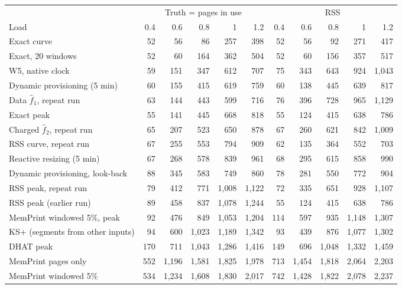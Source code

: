 \begin{tabular}{lrrrrrrrrrr}
\toprule
 & \multicolumn{5}{c}{Truth = pages in use} & \multicolumn{5}{c}{RSS} \\
\cmidrule(lr){2-6} \cmidrule(lr){7-11}
Load & 0.4 & 0.6 & 0.8 & 1 & 1.2 & 0.4 & 0.6 & 0.8 & 1 & 1.2 \\
\midrule
Exact curve & 52 & 56 & 86 & 257 & 398 & 52 & 56 & 92 & 271 & 417 \\
Exact, 20 windows & 52 & 60 & 164 & 362 & 504 & 52 & 60 & 156 & 357 & 517 \\
\memprint{} W5, native clock & 59 & 151 & 347 & 612 & 707 & 75 & 343 & 643 & 924 & 1{,}043 \\
Dynamic provisioning (5 min) & 60 & 155 & 415 & 619 & 759 & 60 & 138 & 445 & 639 & 817 \\
Data $\hat f_1$, repeat run & 63 & 144 & 443 & 599 & 716 & 76 & 396 & 728 & 965 & 1{,}129 \\
Exact peak & 55 & 141 & 445 & 668 & 818 & 55 & 124 & 415 & 638 & 786 \\
Charged $\hat f_2$, repeat run & 65 & 207 & 523 & 650 & 878 & 67 & 260 & 621 & 842 & 1{,}009 \\
RSS curve, repeat run & 67 & 255 & 553 & 794 & 909 & 62 & 135 & 364 & 552 & 703 \\
Reactive resizing (5 min) & 67 & 268 & 578 & 839 & 961 & 68 & 295 & 615 & 858 & 990 \\
Dynamic provisioning, look-back & 88 & 345 & 583 & 749 & 860 & 78 & 281 & 550 & 772 & 904 \\
RSS peak, repeat run & 79 & 412 & 771 & 1{,}008 & 1{,}122 & 72 & 335 & 651 & 928 & 1{,}107 \\
RSS peak (earlier run) & 89 & 458 & 837 & 1{,}078 & 1{,}244 & 55 & 124 & 415 & 638 & 786 \\
MemPrint windowed 5\%, peak & 92 & 476 & 849 & 1{,}053 & 1{,}204 & 114 & 597 & 935 & 1{,}148 & 1{,}307 \\
KS+ (segments from other inputs) & 94 & 600 & 1{,}023 & 1{,}189 & 1{,}342 & 93 & 439 & 876 & 1{,}077 & 1{,}302 \\
DHAT peak & 170 & 711 & 1{,}043 & 1{,}286 & 1{,}416 & 149 & 696 & 1{,}048 & 1{,}332 & 1{,}459 \\
MemPrint pages only & 552 & 1{,}196 & 1{,}581 & 1{,}825 & 1{,}978 & 713 & 1{,}454 & 1{,}818 & 2{,}064 & 2{,}203 \\
MemPrint windowed 5\% & 534 & 1{,}234 & 1{,}608 & 1{,}830 & 2{,}017 & 742 & 1{,}428 & 1{,}822 & 2{,}078 & 2{,}237 \\

\end{tabular}
